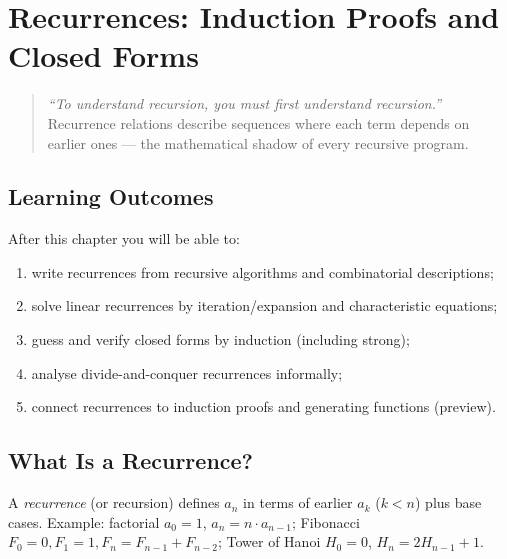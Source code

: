 \chapter[Recurrences]{Recurrences: Induction Proofs and Closed Forms}
\label{ch:recurrence}

\begin{quote}
\emph{``To understand recursion, you must first understand recursion.''} Recurrence relations describe sequences where each term depends on earlier ones --- the mathematical shadow of every recursive program.
\end{quote}

\noindent{}
\vspace{0.4em}

\section*{Learning Outcomes}
After this chapter you will be able to:
\begin{enumerate}[label=(L\arabic*)]
    \item write recurrences from recursive algorithms and combinatorial descriptions;
    \item solve linear recurrences by iteration/expansion and characteristic equations;
    \item guess and verify closed forms by induction (including strong);
    \item analyse divide-and-conquer recurrences informally;
    \item connect recurrences to induction proofs and generating functions (preview).
\end{enumerate}

\section{What Is a Recurrence?}
\label{sec:what-is-recurrence}
A \emph{recurrence} (or recursion) defines $a_n$ in terms of earlier $a_k$ ($k<n$) plus base cases. Example: factorial $a_0=1$, $a_n=n\cdot a_{n-1}$; Fibonacci $F_0=0,F_1=1,F_n=F_{n-1}+F_{n-2}$; Tower of Hanoi $H_0=0$, $H_n=2H_{n-1}+1$.

